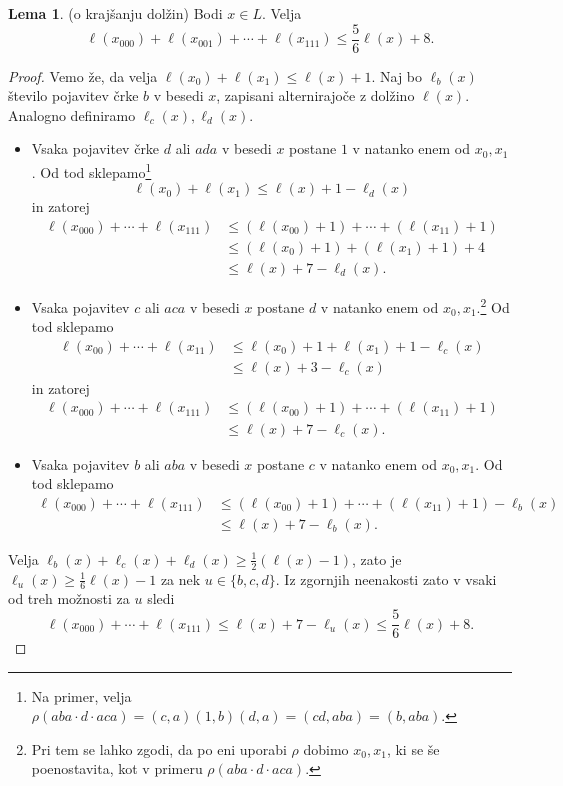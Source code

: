\documentclass[11pt]{book}
\def\razstavi{\rho}
\theoremstyle{definition}
\theoremstyle{zgled}
\theoremstyle{odprtproblem}
\theoremstyle{domacanaloga}
\newenvironment{dokaz}
    {\color{siva}\begin{proof}}
    {\end{proof}}
\theoremstyle{izrek}
\newtheorem*{lema}{Lema}
\begin{document}
\begin{lema}{\sc (o krajšanju dolžin)}
Bodi $x \in L$. Velja
\[
\ell(x_{000}) + \ell(x_{001}) + \cdots + \ell(x_{111}) \leq \frac56 \ell(x) + 8.
\] \vspace{-\baselineskip}
\end{lema}

\begin{dokaz}
Vemo že, da velja $\ell(x_0) + \ell(x_1) \leq \ell(x) + 1$. Naj bo $\ell_b(x)$ število pojavitev črke $b$ v besedi $x$, zapisani alternirajoče z dolžino $\ell(x)$. Analogno definiramo $\ell_c(x), \ell_d(x)$.

\begin{itemize}
    \item Vsaka pojavitev črke $d$ ali $ada$ v besedi $x$ postane $1$ v natanko enem od $x_0, x_1$. Od tod sklepamo\footnote{Na primer, velja $\razstavi(aba \cdot d \cdot aca) = (c,a)(1,b)(d,a) = (cd, aba) = (b, aba)$.}
\[
\ell(x_0) + \ell(x_1) \leq \ell(x) + 1 - \ell_d(x)
\]
in zatorej
\begin{align*}
\ell(x_{000}) + \cdots + \ell(x_{111}) &\leq (\ell(x_{00}) + 1) + \cdots + (\ell(x_{11}) + 1) \\
&\leq (\ell(x_0) + 1) + (\ell(x_1) + 1) + 4 \\
&\leq \ell(x) + 7 - \ell_d(x). 
\end{align*}
    
    \item Vsaka pojavitev $c$ ali $aca$ v besedi $x$ postane $d$ v natanko enem od $x_0, x_1$.\footnote{Pri tem se lahko zgodi, da po eni uporabi $\razstavi$ dobimo $x_0, x_1$, ki se še poenostavita, kot v primeru $\razstavi(aba \cdot d \cdot aca)$.} Od tod sklepamo
\begin{align*}
\ell(x_{00}) + \cdots + \ell(x_{11}) &\leq \ell(x_0) + 1 + \ell(x_1) + 1 - \ell_c(x) \\
&\leq \ell(x) + 3 - \ell_c(x)
\end{align*}
in zatorej
\begin{align*}
\ell(x_{000}) + \cdots + \ell(x_{111}) &\leq (\ell(x_{00}) + 1) + \cdots + (\ell(x_{11}) + 1) \\
&\leq \ell(x) + 7 - \ell_c(x).
\end{align*}

    \item Vsaka pojavitev $b$ ali $aba$ v besedi $x$ postane $c$ v natanko enem od $x_0, x_1$. Od tod sklepamo
\begin{align*}
\ell(x_{000}) + \cdots + \ell(x_{111}) &\leq (\ell(x_{00}) + 1) + \cdots + (\ell(x_{11}) + 1) - \ell_b(x) \\
&\leq \ell(x) + 7 - \ell_b(x). 
\end{align*}
\end{itemize}

Velja $\ell_b(x) + \ell_c(x) + \ell_d(x) \geq \frac12 (\ell(x) - 1)$, zato je $\ell_u(x) \geq \frac16 \ell(x) - 1$ za nek $u \in \{ b,c,d\}$. Iz zgornjih neenakosti zato v vsaki od treh možnosti za $u$ sledi
\[
\ell(x_{000}) + \cdots + \ell(x_{111}) \leq \ell(x) + 7 - \ell_u(x) \leq \frac56 \ell(x) + 8.
\]
\end{dokaz}
\end{document}
